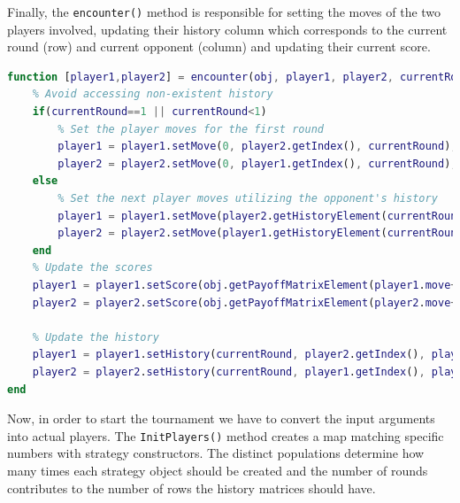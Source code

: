 \documentclass[12pt]{article}
\begin{document}
Finally, the \texttt{encounter()} method is responsible for setting the moves of the two players involved, updating their history column which corresponds to the current round (row) and current opponent (column) and updating their current score.
\begin{lstlisting}[language=Matlab, caption={Full Rounding Logic Implementation}]
% Method to encounter two players
function [player1,player2] = encounter(obj, player1, player2, currentRound)
    % Avoid accessing non-existent history
    if(currentRound==1 || currentRound<1)
        % Set the player moves for the first round 
        player1 = player1.setMove(0, player2.getIndex(), currentRound); % First round
        player2 = player2.setMove(0, player1.getIndex(), currentRound); % First round
    else
        % Set the next player moves utilizing the opponent's history
        player1 = player1.setMove(player2.getHistoryElement(currentRound-1,player1.getIndex()), player2.getIndex(), currentRound); % Previous round row 
        player2 = player2.setMove(player1.getHistoryElement(currentRound-1,player2.getIndex()), player1.getIndex(), currentRound); % Opponent's index column
    end
    % Update the scores
    player1 = player1.setScore(obj.getPayoffMatrixElement(player1.move+1, player2.move+1));
    player2 = player2.setScore(obj.getPayoffMatrixElement(player2.move+1, player1.move+1));

    % Update the history
    player1 = player1.setHistory(currentRound, player2.getIndex(), player1.getMove());
    player2 = player2.setHistory(currentRound, player1.getIndex(), player2.getMove());
end
\end{lstlisting}
Now, in order to start the tournament we have to convert the input arguments into actual players. The \texttt{InitPlayers()} method creates a map matching specific numbers with strategy constructors. The distinct populations determine how many times each strategy object should be created and the number of rounds contributes to the number of rows the history matrices should have.
\end{document}
